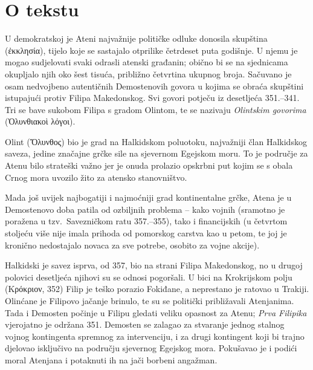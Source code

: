 


\section*{O tekstu}

U demokratskoj je Ateni najvažnije političke odluke donosila skupština \textgreek[variant=ancient]{(ἐκκλησία),} tijelo koje se sastajalo otprilike četrdeset puta godišnje. U njemu je mogao sudjelovati svaki odrasli atenski građanin; obično bi se na sjednicama okupljalo njih oko šest tisuća, približno četvrtina ukupnog broja. Sačuvano je osam nedvojbeno autentičnih Demostenovih govora u kojima se obraća skupštini istupajući protiv Filipa Makedonskog. Svi govori potječu iz desetljeća 351.–341. Tri se bave sukobom Filipa s gradom Olintom, te se nazivaju \textit{Olintskim govorima} \textgreek[variant=ancient]{(Ὀλυνθιακοὶ λόγοι).}

Olint \textgreek[variant=ancient]{(Ὄλυνθος)} bio je grad na Halkidskom poluotoku, najvažniji član Halkidskog saveza, jedine značajne grčke sile na sjevernom Egejskom moru. To je područje za Atenu bilo strateški važno jer je onuda prolazio opskrbni put kojim se s obala Crnog mora uvozilo žito za atensko stanovništvo. 

Mada još uvijek najbogatiji i najmoćniji grad kontinentalne grčke, Atena je u Demostenovo doba patila od ozbiljnih problema – kako vojnih (sramotno je poražena u tzv.\ Savezničkom ratu 357.–355), tako i financijskih (u četvrtom stoljeću više nije imala prihoda od pomorskog carstva kao u petom, te joj je kronično nedostajalo novaca za sve potrebe, osobito za vojne akcije).

Halkidski je savez isprva, od 357, bio na strani Filipa Makedonskog, no u drugoj polovici desetljeća njihovi su se odnosi pogoršali. U bici na Krokrijskom polju \textgreek[variant=ancient]{(Κρόκριον,} 352) Filip je teško porazio Fokiđane, a neprestano je ratovao u Trakiji. Olinćane je Filipovo jačanje brinulo, te su se politički približavali Atenjanima. Tada i Demosten počinje u Filipu gledati veliku opasnost za Atenu; \textit{Prva Filipika} vjerojatno je održana 351. Demosten se zalagao za stvaranje jednog stalnog vojnog kontingenta spremnog za intervenciju, i za drugi kontingent koji bi trajno djelovao isključivo na području sjevernog Egejskog mora. Pokušavao je i podići moral Atenjana i potaknuti ih na jači borbeni angažman.

